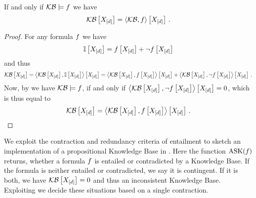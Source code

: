 \begin{theorem}\label{the:ReduncancyOfEntailed}
	If and only if $\mathcal{KB}\models f$ we have
	\begin{align*}
		\mathcal{KB}\left[X_{[d]}\right]= \left\langle \mathcal{KB},f\right\rangle \left[ X_{[d]} \right]  \, . 
	\end{align*}
\end{theorem}
\begin{proof}
	For any formula $f$ we have
	\begin{align*}
		\mathbb{I}\left[X_{[d]}\right] = f\left[X_{[d]}\right] + \lnot f\left[X_{[d]}\right]
	\end{align*}
	and thus
	\begin{align*}
		\mathcal{KB}\left[X_{[d]}\right] 
		= \left\langle \mathcal{KB}\left[X_{[d]}\right],\mathbb{I}\left[X_{[d]}\right]\right\rangle \left[ X_{[d]} \right]
		= \left\langle \mathcal{KB}\left[X_{[d]}\right],f\left[X_{[d]}\right]\right\rangle \left[ X_{[d]} \right] +  \left\langle \mathcal{KB}\left[X_{[d]}\right],\lnot f\left[X_{[d]}\right]\right\rangle \left[ X_{[d]} \right] \, .
	\end{align*}
	Now, by  we have $\mathcal{KB}\models f$, if and only if $\left\langle \mathcal{KB}\left[X_{[d]}\right],\lnot f\left[X_{[d]}\right]\right\rangle \left[ X_{[d]} \right]=0$, which is thus equal to
	\begin{align*}
		\mathcal{KB}\left[X_{[d]}\right]
		= \left\langle \mathcal{KB}\left[X_{[d]}\right],f\left[X_{[d]}\right]\right\rangle \left[ X_{[d]} \right] \, .
	\end{align*}
\end{proof}



We exploit the contraction and redundancy criteria of entailment to sketch an implementation of a propositional Knowledge Base in .
Here the function $\mathrm{ASK}(f)$ returns, whether a formula $f$ is entailed or contradicted by a Knowledge Base.
If the formula is neither entailed or contradicted, we say it is contingent.
If it is both, we have $\mathcal{KB}\left[X_{[d]}\right]=0$ and thus an inconsistent Knowledge Base.
Exploiting  we decide these situations based on a single contraction.

